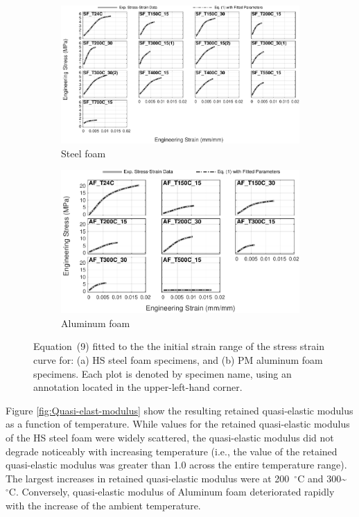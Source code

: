 \documentclass[review]{elsarticle}
\begin{document}
\begin{figure}
	\centering
	\begin{subfigure}{1.00\textwidth}
		\centering
		\includegraphics[width=0.90\linewidth]
		{Tex-Figures/Fig16a-quasi-Elastic-fit-Fe.pdf}
		\caption{Steel foam}
		\label{fig:qElas_Rich_Steel}
	\end{subfigure}

	\par\bigskip %

	\begin{subfigure}{1.00\textwidth}
		\centering
		\includegraphics[width=0.70\linewidth]
		{Tex-Figures/Fig16b-quasi-Elastic-fit-Al.pdf}
		\caption{Aluminum foam}
		\label{fig:qElas_Rich_Al}
	\end{subfigure}
	\caption{ Equation~(9) fitted to the the initial strain range of the stress strain curve for: (a) HS steel foam specimens, and (b) PM aluminum foam specimens. Each plot is denoted by specimen name, using an annotation located in the upper-left-hand corner.}
	\label{fig:Stress_strain_elast_fit}
\end{figure}

Figure \ref{fig:Quasi-elast-modulus} show the resulting retained quasi-elastic modulus as a function of temperature. While values for the retained quasi-elastic modulus of the HS steel foam were widely scattered, the quasi-elastic modulus did not degrade noticeably with increasing temperature (i.e., the value of the retained quasi-elastic modulus was greater than 1.0 across the entire temperature range). The largest increases in retained quasi-elastic modulus were at 200~$^{\circ}\mathrm{C}$ and 300\~$^{\circ}\mathrm{C}$. Conversely, quasi-elastic modulus of Aluminum foam deteriorated rapidly with the increase of the ambient temperature.
\end{document}
